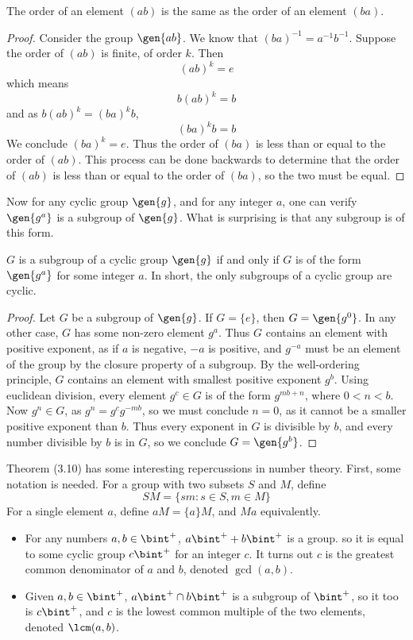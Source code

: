 \begin{lemma} The order of an element $(ab)$ is the same as the order of an element $(ba)$. \end{lemma}
\begin{proof}
    Consider the group $\gen{ab}$. We know that $(ba)^{-1} = a^{-1}b^{-1}$. Suppose the order of $(ab)$ is finite, of order $k$. Then
    \[ (ab)^k = e \]
    which means
    \[ b(ab)^k = b \]
    and as $b(ab)^k = (ba)^k b$,
    \[ (ba)^k b = b \]
    We conclude $(ba)^k = e$. Thus the order of $(ba)$ is less than or equal to the order of $(ab)$. This process can be done backwards to determine that the order of $(ab)$ is less than or equal to the order of $(ba)$, so the two must be equal.
\end{proof}

Now for any cyclic group $\gen{g}$, and for any integer $a$, one can verify $\gen{g^a}$ is a subgroup of $\gen{g}$. What is surprising is that any subgroup is of this form.

\begin{theorem}
    $G$ is a subgroup of a cyclic group $\gen{g}$ if and only if $G$ is of the form $\gen{g^a}$ for some integer $a$. In short, the only subgroups of a cyclic group are cyclic.
\end{theorem}
\begin{proof}
    Let $G$ be a subgroup of $\gen{g}$. If $G = \{ e \}$, then $G = \gen{g^0}$. In any other case, $G$ has some non-zero element $g^a$. Thus $G$ contains an element with positive exponent, as if $a$ is negative, $-a$ is positive, and $g^{-a}$ must be an element of the group by the closure property of a subgroup. By the well-ordering principle, $G$ contains an element with smallest positive exponent $g^b$. Using euclidean division, every element $g^c \in G$ is of the form $g^{mb + n}$, where $0 < n < b$. Now $g^n \in G$, as $g^n = g^cg^{-mb}$, so we must conclude $n = 0$, as it cannot be a smaller positive exponent than $b$. Thus every exponent in $G$ is divisible by $b$, and every number divisible by $b$ is in $G$, so we conclude $G = \gen{g^b}$.
\end{proof}

Theorem (3.10) has some interesting repercussions in number theory. First, some notation is needed. For a group with two subsets $S$ and $M$, define
%
\[ SM = \{ sm : s \in S, m \in M \} \]
%
For a single element $a$, define $aM = \{ a \}M$, and $Ma$ equivalently.
\begin{itemize}
    \item For any numbers $a, b \in \bint^+$, $a\bint^+ + b\bint^+$ is a group. so it is equal to some cyclic group $c\bint^+$ for an integer $c$. It turns out $c$ is the greatest common denominator  of $a$ and $b$, denoted $\gcd(a,b)$.
    \item Given $a,b \in \bint^+$, $a\bint^+ \cap b\bint^+$ is a subgroup of $\bint^+$, so it too is $c\bint^+$, and $c$ is the lowest common multiple  of the two elements, denoted $\lcm(a,b)$.
\end{itemize}


